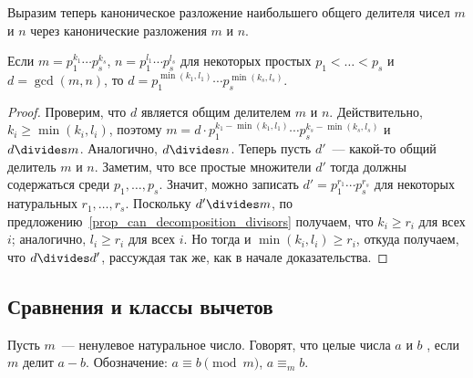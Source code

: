 Выразим теперь каноническое разложение наибольшего общего делителя
чисел $m$ и $n$ через канонические разложения $m$ и $n$.

\begin{proposition}\label{prop_gcd_canonical}
Если $m=p_1^{k_1}\cdots p_s^{k_s}$, $n=p_1^{l_1}\cdots p_s^{l_s}$ для
некоторых простых $p_1<\dots<p_s$ и $d=\gcd(m,n)$, то
$d=p_1^{\min(k_1,l_1)}\cdots p_s^{\min(k_s,l_s)}$.
\end{proposition}
\begin{proof}
Проверим, что $d$ является общим делителем $m$ и $n$. Действительно,
$k_i\geq\min(k_i,l_i)$, поэтому $m=d\cdot
p_1^{k_1-\min(k_1,l_1)}\cdots p_s^{k_s-\min(k_s,l_s)}$ и $d\divides
m$. Аналогично,
$d\divides n$.
Теперь пусть $d'$~--- какой-то общий делитель $m$ и $n$. Заметим, что
все простые множители $d'$ тогда должны содержаться среди
$p_1,\dots,p_s$. Значит, можно записать $d'=p_1^{r_1}\cdots p_s^{r_s}$
для некоторых натуральных $r_1,\dots,r_s$. Поскольку $d'\divides m$,
по предложению~\ref{prop_can_decomposition_divisors} получаем, что
$k_i\geq r_i$ для всех $i$; аналогично, $l_i\geq r_i$ для всех $i$. Но
тогда и $\min(k_i,l_i)\geq r_i$, откуда получаем, что $d\divides d'$,
рассуждая так же, как в начале доказательства.
\end{proof}

\subsection{Сравнения и классы вычетов}


\begin{definition}
Пусть $m$~--- ненулевое натуральное число.
Говорят, что целые числа $a$ и $b$ , если
$m$ делит $a-b$. Обозначение: $a\equiv b\pmod m$, $a\equiv_mb$.
\end{definition}

